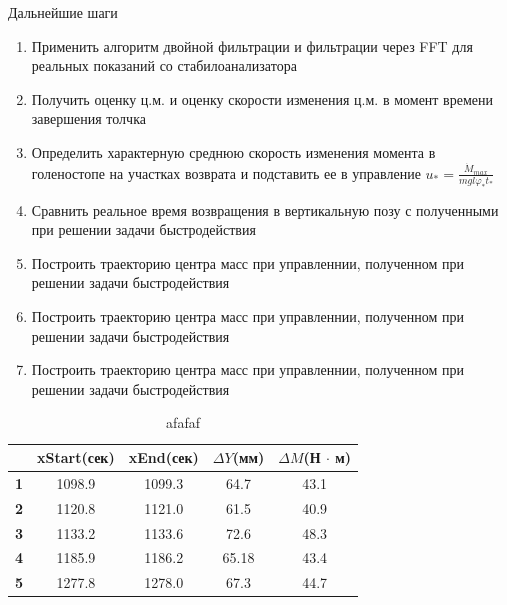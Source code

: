 \documentclass[10pt]{beamer}
\begin{document}
\begin{frame}[shrink=7]{Дальнейшие шаги}
	\begin{enumerate}
		\item Применить алгоритм двойной фильтрации и фильтрации через FFT для реальных показаний со стабилоанализатора
		\item Получить оценку ц.м. и оценку скорости изменения ц.м. в момент времени завершения толчка
		\item Определить характерную среднюю скорость изменения момента в голеностопе на участках возврата и подставить ее в управление $u_{\ast}=\frac{\dot{M}_{max}}{mgl\varphi_\ast t_\ast}$
		\item Сравнить реальное время возвращения в вертикальную позу с полученными при решении задачи быстродействия
		\item Построить траекторию центра масс при управленнии, полученном при решении задачи быстродействия
		\item Построить траекторию центра масс при управленнии, полученном при решении задачи быстродействия
		\item Построить траекторию центра масс при управленнии, полученном при решении задачи быстродействия
	  \end{enumerate}
	
\end{frame}

\begin{frame}
\begin{table}[]
	\centering
	\begin{tabular}{@{}|l|c|c|c|c|@{}}
	\toprule
	\textbf{} &
	  \multicolumn{1}{l|}{\textbf{xStart(сек)}} &
	  \multicolumn{1}{l|}{\textbf{xEnd(сек)}} &
	  \multicolumn{1}{l|}{\textbf{$\Delta Y$(мм)}} &
	  \multicolumn{1}{l|}{\textbf{$\Delta M $(Н $\cdot$ м)}} \\ \midrule
	\textbf{1} & 1098.9 & 1099.3 & 64.7  & 43.1 \\ \midrule
	\textbf{2} & 1120.8 & 1121.0 & 61.5  & 40.9 \\ \midrule
	\textbf{3} & 1133.2 & 1133.6 & 72.6  & 48.3 \\ \midrule
	\textbf{4} & 1185.9 & 1186.2 & 65.18 & 43.4 \\ \midrule
	\textbf{5} & 1277.8 & 1278.0 & 67.3  & 44.7 \\ \bottomrule
	\end{tabular}
	\caption{afafaf}
	\label{tab:my-table}
	\end{table}
\end{frame}
\end{document}
